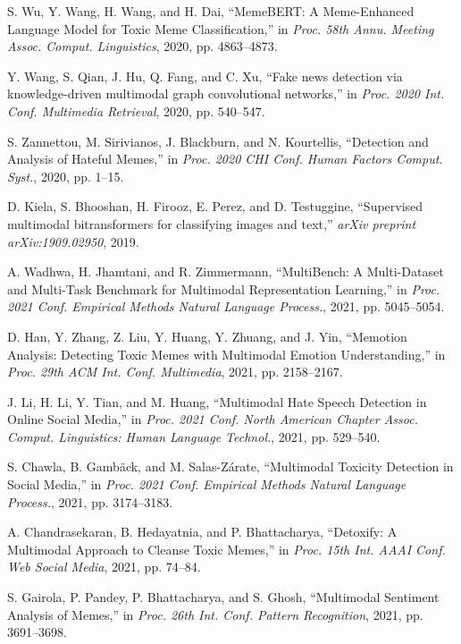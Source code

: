 \documentclass{ieeeaccess}
\begin{document}
\begin{thebibliography}{00}

 S. Wu, Y. Wang, H. Wang, and H. Dai, ``MemeBERT: A Meme-Enhanced Language Model for Toxic Meme Classification,'' in \emph{Proc. 58th Annu. Meeting Assoc. Comput. Linguistics}, 2020, pp. 4863--4873.

 Y. Wang, S. Qian, J. Hu, Q. Fang, and C. Xu, ``Fake news detection via knowledge-driven multimodal graph convolutional networks,'' in \emph{Proc. 2020 Int. Conf. Multimedia Retrieval}, 2020, pp. 540--547.

 S. Zannettou, M. Sirivianos, J. Blackburn, and N. Kourtellis, ``Detection and Analysis of Hateful Memes,'' in \emph{Proc. 2020 CHI Conf. Human Factors Comput. Syst.}, 2020, pp. 1--15.

 D. Kiela, S. Bhooshan, H. Firooz, E. Perez, and D. Testuggine, ``Supervised multimodal bitransformers for classifying images and text,'' \emph{arXiv preprint arXiv:1909.02950}, 2019.

 A. Wadhwa, H. Jhamtani, and R. Zimmermann, ``MultiBench: A Multi-Dataset and Multi-Task Benchmark for Multimodal Representation Learning,'' in \emph{Proc. 2021 Conf. Empirical Methods Natural Language Process.}, 2021, pp. 5045--5054.

 D. Han, Y. Zhang, Z. Liu, Y. Huang, Y. Zhuang, and J. Yin, ``Memotion Analysis: Detecting Toxic Memes with Multimodal Emotion Understanding,'' in \emph{Proc. 29th ACM Int. Conf. Multimedia}, 2021, pp. 2158--2167.

 J. Li, H. Li, Y. Tian, and M. Huang, ``Multimodal Hate Speech Detection in Online Social Media,'' in \emph{Proc. 2021 Conf. North American Chapter Assoc. Comput. Linguistics: Human Language Technol.}, 2021, pp. 529--540.

 S. Chawla, B. Gambäck, and M. Salas-Zárate, ``Multimodal Toxicity Detection in Social Media,'' in \emph{Proc. 2021 Conf. Empirical Methods Natural Language Process.}, 2021, pp. 3174--3183.

 A. Chandrasekaran, B. Hedayatnia, and P. Bhattacharya, ``Detoxify: A Multimodal Approach to Cleanse Toxic Memes,'' in \emph{Proc. 15th Int. AAAI Conf. Web Social Media}, 2021, pp. 74--84.

 S. Gairola, P. Pandey, P. Bhattacharya, and S. Ghosh, ``Multimodal Sentiment Analysis of Memes,'' in \emph{Proc. 26th Int. Conf. Pattern Recognition}, 2021, pp. 3691--3698.


\end{thebibliography}
\end{document}
